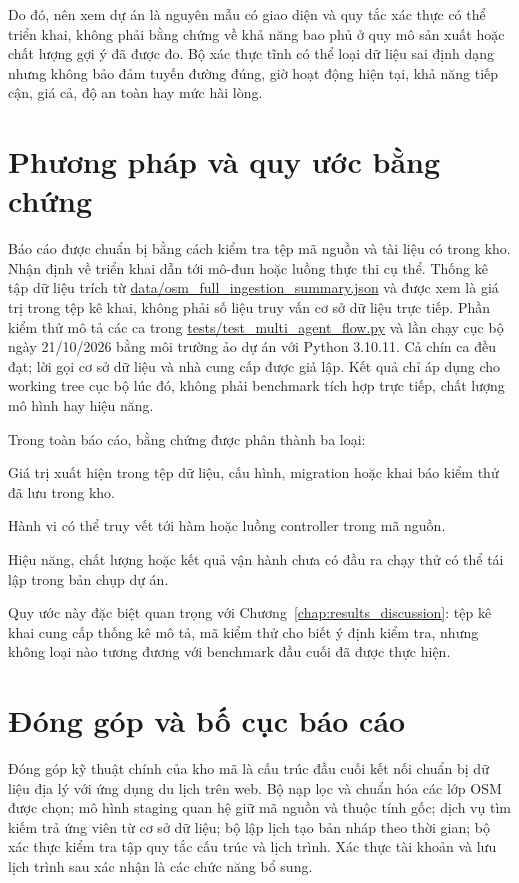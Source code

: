 Do đó, nên xem dự án là nguyên mẫu có giao diện và quy tắc xác thực có thể triển khai, không phải bằng chứng về khả năng bao phủ ở quy mô sản xuất hoặc chất lượng gợi ý đã được đo. Bộ xác thực tĩnh có thể loại dữ liệu sai định dạng nhưng không bảo đảm tuyến đường đúng, giờ hoạt động hiện tại, khả năng tiếp cận, giá cả, độ an toàn hay mức hài lòng.

\section{Phương pháp và quy ước bằng chứng}

Báo cáo được chuẩn bị bằng cách kiểm tra tệp mã nguồn và tài liệu có trong kho. Nhận định về triển khai dẫn tới mô-đun hoặc luồng thực thi cụ thể. Thống kê tập dữ liệu trích từ \url{data/osm_full_ingestion_summary.json} và được xem là giá trị trong tệp kê khai, không phải số liệu truy vấn cơ sở dữ liệu trực tiếp. Phần kiểm thử mô tả các ca trong \url{tests/test_multi_agent_flow.py} và lần chạy cục bộ ngày 21/10/2026 bằng môi trường ảo dự án với Python 3.10.11. Cả chín ca đều đạt; lời gọi cơ sở dữ liệu và nhà cung cấp được giả lập. Kết quả chỉ áp dụng cho working tree cục bộ lúc đó, không phải benchmark tích hợp trực tiếp, chất lượng mô hình hay hiệu năng.

Trong toàn báo cáo, bằng chứng được phân thành ba loại:
\begin{description}[leftmargin=2.1cm,style=standard,itemsep=1pt,parsep=0pt]
    \item[Đã ghi nhận] Giá trị xuất hiện trong tệp dữ liệu, cấu hình, migration hoặc khai báo kiểm thử đã lưu trong kho.
    \item[Đã triển khai] Hành vi có thể truy vết tới hàm hoặc luồng controller trong mã nguồn.
    \item[Chưa đo] Hiệu năng, chất lượng hoặc kết quả vận hành chưa có đầu ra chạy thử có thể tái lập trong bản chụp dự án.
\end{description}
Quy ước này đặc biệt quan trọng với Chương~\ref{chap:results_discussion}: tệp kê khai cung cấp thống kê mô tả, mã kiểm thử cho biết ý định kiểm tra, nhưng không loại nào tương đương với benchmark đầu cuối đã được thực hiện.

\section{Đóng góp và bố cục báo cáo}

Đóng góp kỹ thuật chính của kho mã là cấu trúc đầu cuối kết nối chuẩn bị dữ liệu địa lý với ứng dụng du lịch trên web. Bộ nạp lọc và chuẩn hóa các lớp OSM được chọn; mô hình staging quan hệ giữ mã nguồn và thuộc tính gốc; dịch vụ tìm kiếm trả ứng viên từ cơ sở dữ liệu; bộ lập lịch tạo bản nháp theo thời gian; bộ xác thực kiểm tra tập quy tắc cấu trúc và lịch trình. Xác thực tài khoản và lưu lịch trình sau xác nhận là các chức năng bổ sung.

